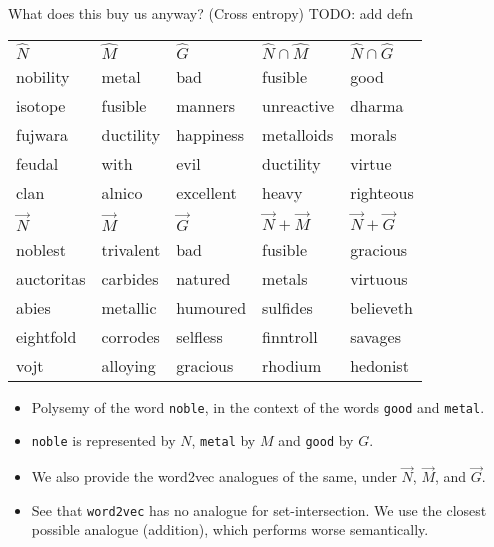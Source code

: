 \documentclass[8pt]{beamer}
\begin{document}
\begin{frame}{What does this buy us anyway? (Cross entropy)}
TODO: add defn
     \begin{tabular}{l l l l l}
         $\hat N$    & $\hat M$  & $\hat G$  & $\hat N \cap \hat M$  & $\hat N \cap \hat G$      \\
         nobility    & metal     & bad       & fusible               & good                      \\
         isotope     & fusible   & manners   & unreactive            & dharma                    \\
         fujwara     & ductility & happiness & metalloids            & morals                    \\
         feudal      & with      & evil      & ductility             & virtue                    \\
         clan        & alnico    & excellent & heavy                 & righteous             \\ \midrule
         $\vec N$    & $\vec M$  & $\vec G$  & $\vec N + \vec M$     & $\vec N + \vec G$         \\
         noblest     & trivalent & bad       & fusible               & gracious                  \\
         auctoritas  & carbides  & natured   & metals                & virtuous                  \\
         abies       & metallic  & humoured  & sulfides              & believeth                 \\
         eightfold   & corrodes  & selfless  & finntroll             & savages                   \\
         vojt        & alloying  & gracious  & rhodium               & hedonist
   \end{tabular}

\begin{itemize}
\item Polysemy of the word \texttt{noble}, in the context of the words \texttt{good} and \texttt{metal}.
\item \texttt{noble} is represented by $N$, \texttt{metal} by $M$ and \texttt{good} by $G$.
\item We also provide the word2vec analogues of the same, under $\vec N$, $\vec M$, and $\vec G$.
\item See that \texttt{word2vec} has no analogue for set-intersection. We use the closest possible analogue (addition), which performs worse semantically.
\end{itemize}
\end{frame}
\end{document}
